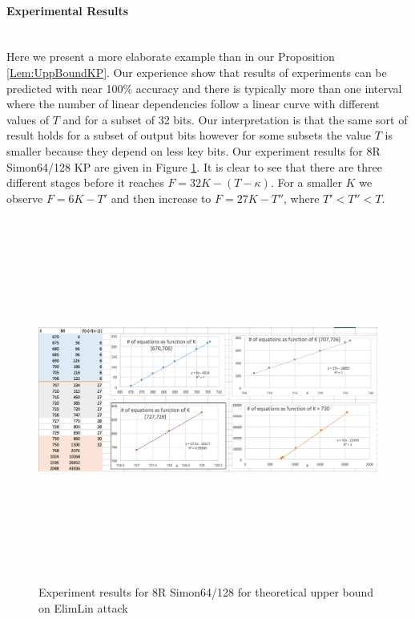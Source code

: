 \paragraph{Experimental Results} \mbox{} \\
Here we present a more elaborate example than in our Proposition \ref{Lem:UppBoundKP}. 
Our experience show that results of experiments can be predicted with near 100$\%$ accuracy and 
there is typically more than one interval where the number of linear dependencies follow a linear curve 
with different values of $T$ and for a subset of 32 bits. Our interpretation is that 
the same sort of result holds for a subset of output bits however for some subsets the value $T$ is smaller because they depend on less key bits.
Our experiment results for 8R Simon64/128 KP are given in Figure \ref{fig:FullResBig}. It is clear to see that there are three different stages before it reaches $F = 32 K - (T-\kappa)$. For a smaller $K$ we observe $F = 6K - T'$ and then increase to $F = 27K - T''$, where $T'<T''<T$.

\begin{figure}[h!]
	\centering
	\begin{minipage}[b][22cm][b]{12cm}
		\begin{turn}{90}
			\includegraphics*[width=220mm, height = 120mm]{./pics/ch6BigScreen.png}
			\end{turn}
			\end{minipage}
			\begin{turn}{90}
				\begin{minipage}[c][1cm][c]{22cm}
					\caption{Experiment results for 8R Simon64/128 for theoretical upper bound on ElimLin attack }
					\label{fig:FullResBig}
					\end{minipage} 
					\end{turn}
					\end{figure}

